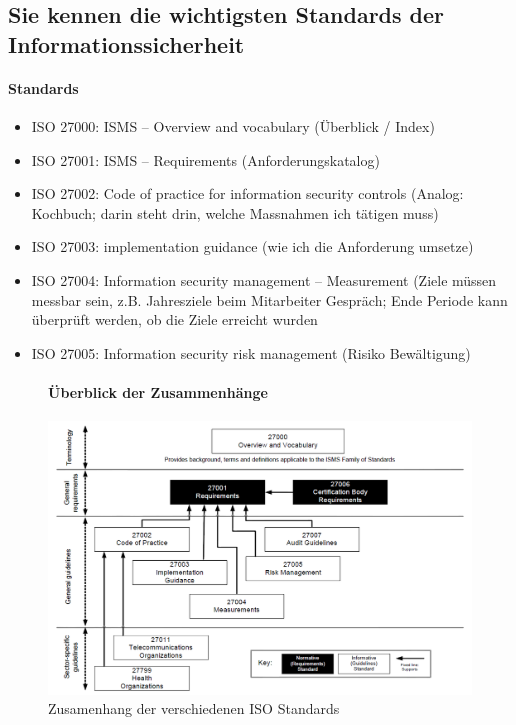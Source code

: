 \documentclass[10pt,a4paper]{article}
\begin{document}
\subsection*{Sie kennen die wichtigsten Standards der Informationssicherheit}
\paragraph*{Standards}
\begin{itemize}[noitemsep,topsep=0pt,leftmargin=*]
    \item ISO 27000: ISMS – Overview and vocabulary (Überblick / Index)
    \item ISO 27001: ISMS – Requirements (Anforderungskatalog)
    \item ISO 27002: Code of practice for information security controls (Analog: Kochbuch; darin steht drin, welche Massnahmen ich tätigen muss)
    \item ISO 27003: implementation guidance (wie ich die Anforderung umsetze)
    \item ISO 27004: Information security management – Measurement (Ziele müssen messbar sein, z.B. Jahresziele beim Mitarbeiter Gespräch; Ende Periode kann überprüft werden, ob die Ziele erreicht wurden
    \item ISO 27005: Information security risk management (Risiko Bewältigung)
\end{itemize}

\begin{figure}[H]
\paragraph*{Überblick der Zusammenhänge}
    \begin{center}
    \includegraphics[width=15cm]{images/iso27000.png}
    \caption{Zusamenhang der verschiedenen ISO Standards \cite{iso27000}}
    \label{iso27000}
    \end{center}
\end{figure}
\end{document}
